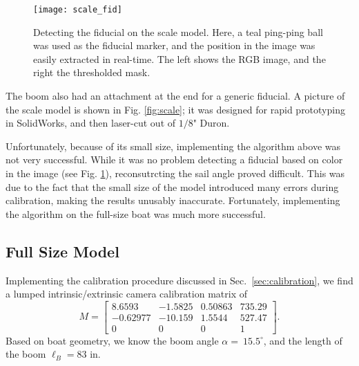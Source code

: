 \documentclass[letterpaper, 10 pt, conference]{ieeeconf}  %
\begin{document}
\begin{figure}[htbp]
  \centering
   \texttt{[image: scale\_fid]} 
  \caption{Detecting the fiducial on the scale model. Here, a teal ping-ping ball was used as the fiducial marker, and the position in the image was easily extracted in real-time. The left shows the RGB image, and the right the thresholded mask.}
   \label{fig:scale_fid}
\end{figure}

The boom also had an attachment at the end for a generic fiducial. A picture of the scale model is shown in Fig. \ref{fig:scale}; it was designed for rapid prototyping in SolidWorks, and then laser-cut out of $1/8$" Duron. 

Unfortunately, because of its small size, implementing the algorithm above was not very successful. While it was no problem detecting a fiducial based on color in the image (see Fig. \ref{fig:scale_fid}), reconsutrcting the sail angle proved difficult. This was due to the fact that the small size of the model introduced many errors during calibration, making the results unusably inaccurate. Fortunately, implementing the algorithm on the full-size boat was much more successful. 
\subsection{Full Size Model}
Implementing the calibration procedure discussed in Sec.~\ref{sec:calibration}, we find a lumped intrinsic/extrinsic camera calibration matrix of
\[
M = \left[\begin{array}{cccc}
8.6593 & -1.5825 & 0.50863 & 735.29 \\
-0.62977 & -10.159 & 1.5544 & 527.47 \\
0 & 0 & 0& 1   \end{array}\right].
\]
Based on boat geometry, we know the boom angle $\alpha=~15.5^\circ$, and the length of the boom $\ell_B = 83$ in. 
\end{document}
